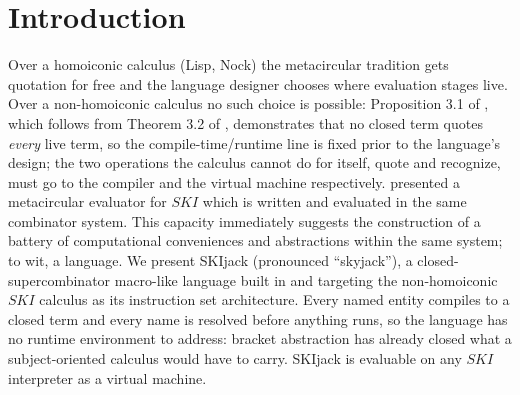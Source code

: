 \documentclass[english,submission,code=tt]{programming}
\begin{document}
\section{Introduction}\label{sec:intro}

Over a homoiconic calculus (Lisp, Nock) the metacircular tradition
\citep{McCarthy1960,Nock4K} gets 
quotation for free and the language designer chooses where evaluation 
stages live. Over a non-homoiconic calculus no such choice is possible: 
Proposition 3.1 of \citet{Davis2027}, which follows from Theorem 3.2
of \citet{JayGivenWilson2011}, demonstrates that no closed term quotes
\emph{every} live term, so the compile-time/runtime 
line is fixed prior to the language's design;
the two operations the calculus cannot do for itself, quote and 
recognize, must go to the compiler and the virtual machine 
respectively.  \citet{Davis2027} presented a metacircular evaluator for 
$SKI$ which is written and evaluated in the same combinator system.  
This capacity 
immediately suggests the construction of a battery of computational 
conveniences and abstractions within the same system; to wit, a 
language.  We present SKIjack (pronounced ``skyjack''), a 
closed-supercombinator macro-like language built in and targeting the 
non-homoiconic $SKI$ calculus as its  instruction set architecture.  
Every named entity compiles to a closed term and every name is resolved 
before anything runs, so the language has no runtime environment to 
address: bracket abstraction has already closed what a subject-oriented 
calculus would have to carry.  SKIjack is evaluable on any $SKI$ 
interpreter as a virtual machine.

\end{document}
